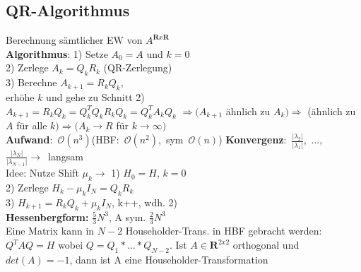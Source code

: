 \subsection{QR-Algorithmus}
Berechnung sämtlicher EW von $A^{\mathbf{R}x\mathbf{R}}$\\
\textbf{Algorithmus}: 1) Setze $A_0 = A$ und $k = 0$\\
2) Zerlege $A_k = Q_kR_k$ (QR-Zerlegung)\\
3) Berechne $A_{k+1} = R_kQ_k$, \\
\hspace*{4mm}erhöhe $k$ und gehe zu Schnitt 2)\\
$A_{k+1} = R_kQ_k = Q_k^TQ_kR_kQ_k = Q_k^TA_kQ_k$
$\Rightarrow (A_{k+1}$ ähnlich zu $A_k) \Rightarrow$ (ähnlich zu $A$ für alle $k) \Rightarrow (A_k \rightarrow R$ für $k \rightarrow \infty)$\\
\mbox{\textbf{Aufwand}: $\mathcal{O}(n^3)$(HBF: $\mathcal{O}(n^2)$, sym $\mathcal{O}(n)$)}
\mbox{\textbf{Konvergenz}: $\frac{|\lambda_2|}{|\lambda_1|}$, ...,  $\frac{|\lambda_N|}{|\lambda_{N-1}|} \rightarrow$ langsam}\\
Idee: Nutze Shift $\mu_k \rightarrow$ 1) $H_0 = H$, $k = 0$\\
2) Zerlege $H_k - \mu_kI_N = Q_kR_k$\\
3) $H_{k+1} = R_kQ_k + \mu_kI_N$, k++, wdh. 2)\\
\textbf{Hessenbergform:} $\frac{5}{3}N^3$, A sym. $\frac{2}{3}N^3$\\ Eine Matrix kann in $N-2$ Householder-Trans. in HBF gebracht werden: $Q^TAQ = H$ wobei $Q = Q_1 * ... * Q_{N-2}$. Ist $A \in \mathbf{R}^{2x2}$ orthogonal und $det(A) = -1$, dann ist A eine Householder-Transformation